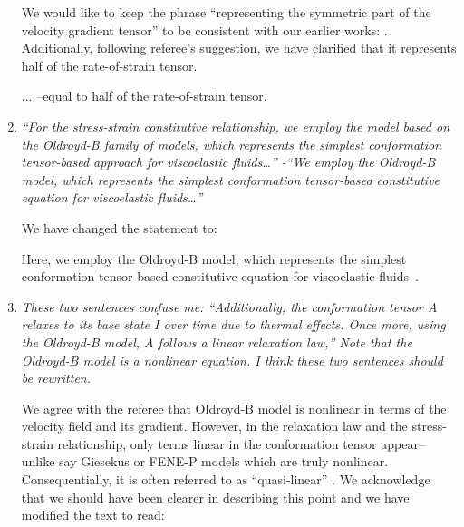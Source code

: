 \documentclass[]{article}
\newcommand{\oo}{\color{magenta} \normalfont}
\newcommand{\bb}{\color{black} \normalfont}
\begin{document}
\begin{enumerate}
We would like to keep the phrase ``representing the symmetric part of the velocity gradient tensor'' to be consistent with our earlier works: \citet{sanjay2021bursting,ari2024bursting}. Additionally, following referee's suggestion, we have clarified that it represents half of the rate-of-strain tensor.

...\oo--equal to half of the rate-of-strain tensor.\bb

\item \textit{``For the stress-strain constitutive relationship, we employ the model based on the
Oldroyd-B family of models, which represents the simplest conformation tensor-based approach for viscoelastic fluids…” -``We employ the Oldroyd-B model, which represents the simplest conformation tensor-based constitutive equation for viscoelastic fluids…”}

We have changed the statement to:

\oo Here, we employ the Oldroyd-B model, which represents the simplest conformation tensor-based constitutive equation for viscoelastic fluids \bb\,\citep{oldroyd1950formulation, bird1977dynamics, snoeijer2020relationship, stone2023note, boyko2024perspective}.


\item \textit{These two sentences confuse me: ``Additionally, the conformation tensor A relaxes to
its base state I over time due to thermal effects. Once more, using the Oldroyd-B
model, A follows a linear relaxation law,” Note that the Oldroyd-B model is a nonlinear equation. I think these two sentences should be rewritten.}


We agree with the referee that Oldroyd-B model is nonlinear in terms of the velocity field and its gradient. However, in the relaxation law and the stress-strain relationship, only terms linear in the conformation tensor appear--unlike say Giesekus or FENE-P models which are truly nonlinear.
Consequentially, it is often referred to as ``quasi-linear” \citep{davoodi2018secondary, alves2021numerical}. %
We acknowledge that we should have been clearer in describing this point and we have modified the text to read:



\end{enumerate}
\end{document}
